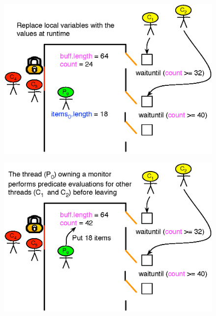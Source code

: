 \documentclass[mathserif,14pt,xcolor=table]{beamer}
\begin{document}
\begin{frame}
     {
        \begin{figure}[ht!]
            \centering
            \includegraphics[scale=0.75]{fig/eval_exp_3.eps}
        \end{figure}
    }
     {
        \begin{figure}[ht!]
            \centering
            \includegraphics[scale=0.75]{fig/eval_exp_4.eps}
        \end{figure}
    }
\end{frame}


\end{document}
